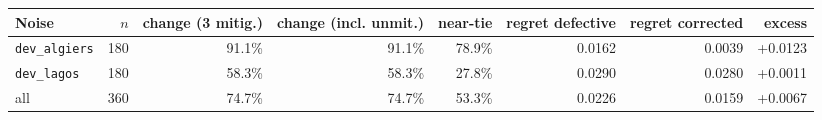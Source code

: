 \begin{tabular}{@{}lrrrrrrr@{}}
\toprule
Noise & $n$ & change (3 mitig.) & change (incl. unmit.) & near-tie & regret defective & regret corrected & excess\\
\midrule
\texttt{dev\_algiers} & 180 & 91.1\% & 91.1\% & 78.9\% & 0.0162 & 0.0039 & +0.0123\\
\texttt{dev\_lagos} & 180 & 58.3\% & 58.3\% & 27.8\% & 0.0290 & 0.0280 & +0.0011\\
all & 360 & 74.7\% & 74.7\% & 53.3\% & 0.0226 & 0.0159 & +0.0067\\
\bottomrule
\end{tabular}
